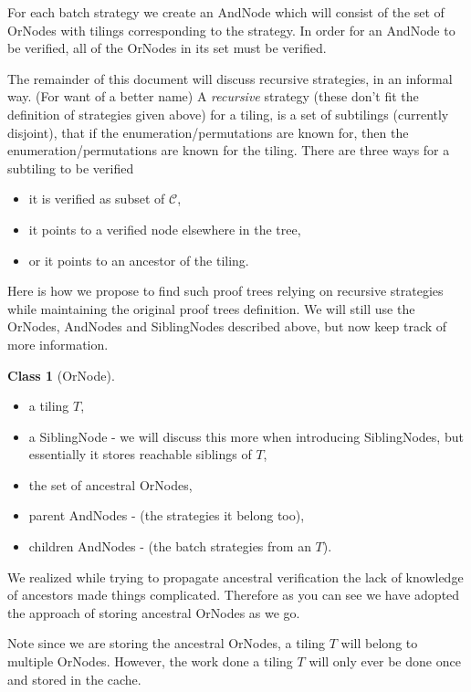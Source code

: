 \documentclass{amsart}
\theoremstyle{definition}
\newtheorem{class}{Class}
\theoremstyle{remark}
\newcommand{\mcC}{\mathcal{C}}
\begin{document}
For each batch strategy we create an AndNode which will consist of the set of
OrNodes with tilings corresponding to the strategy. In order for an AndNode to
be verified, all of the OrNodes in its set must be verified.

The remainder of this document will discuss recursive strategies, in an informal
way. (For want of a better name) A \emph{recursive} strategy (these don't fit
the definition of strategies given above) for a tiling, is a set of subtilings
(currently disjoint), that if the enumeration/permutations are known for, then
the enumeration/permutations are known for the tiling. There are three ways for
a subtiling to be verified
\begin{itemize}
  \item it is verified as subset of $\mcC$,
  \item it points to a verified node elsewhere in the tree,
  \item or it points to an ancestor of the tiling.
\end{itemize}

Here is how we propose to find such proof trees relying on recursive strategies
while maintaining the original proof trees definition. We will still use the
OrNodes, AndNodes and SiblingNodes described above, but now keep track of
more information.

\begin{class}[OrNode]
  \leavevmode
  \begin{itemize}
    \item a tiling $T$,
    \item a SiblingNode - we will discuss this more when introducing
    SiblingNodes, but essentially it stores reachable siblings of $T$,
    \item the set of ancestral OrNodes,
    \item parent AndNodes - (the strategies it belong too),
    \item children AndNodes - (the batch strategies from an $T$).
  \end{itemize}
\end{class}

We realized while trying to propagate ancestral verification the lack of
knowledge of ancestors made things complicated. Therefore as you can see we have
adopted the approach of storing ancestral OrNodes as we go.

Note since we are storing the ancestral OrNodes, a tiling $T$ will belong to
multiple OrNodes. However, the work done a tiling $T$ will only ever be done
once and stored in the cache.
\end{document}
